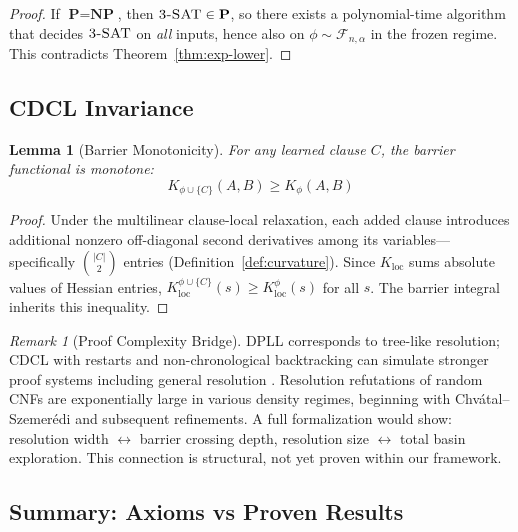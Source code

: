 \documentclass[11pt,a4paper]{article}
\theoremstyle{plain}
\newtheorem{lemma}[theorem]{Lemma}
\theoremstyle{definition}
\theoremstyle{remark}
\newtheorem{remark}[theorem]{Remark}
\newcommand{\threeSAT}{\textsc{3-SAT}}
\newcommand{\NP}{\textbf{NP}}
\newcommand{\PP}{\textbf{P}}
\begin{document}
\begin{proof}
If $\PP=\NP$, then $\threeSAT\in \PP$, so there exists a polynomial-time algorithm that decides $\threeSAT$ on \emph{all} inputs,
hence also on $\phi \sim \mathcal{F}_{n,\alpha}$ in the frozen regime.
This contradicts Theorem~\ref{thm:exp-lower}.
\end{proof}

\subsection{CDCL Invariance}

\begin{lemma}[Barrier Monotonicity]
\label{lem:barrier-mono}
For any learned clause $C$, the barrier functional is monotone:
\begin{equation}
    K_{\phi \cup \{C\}}(A, B) \geq K_{\phi}(A, B)
\end{equation}
\end{lemma}

\begin{proof}
Under the multilinear clause-local relaxation, each added clause introduces additional nonzero off-diagonal second derivatives among its variables---specifically $\binom{|C|}{2}$ entries (Definition~\ref{def:curvature}). Since $K_{\text{loc}}$ sums absolute values of Hessian entries, $K_{\text{loc}}^{\phi \cup \{C\}}(s) \geq K_{\text{loc}}^{\phi}(s)$ for all $s$. The barrier integral inherits this inequality.
\end{proof}

\begin{remark}[Proof Complexity Bridge]
DPLL corresponds to tree-like resolution; CDCL with restarts and non-chronological backtracking can simulate stronger proof systems including general resolution \cite{pipatsrisawat2011}. Resolution refutations of random CNFs are exponentially large in various density regimes, beginning with Chv\'{a}tal--Szemer\'{e}di \cite{chvatal1988} and subsequent refinements. A full formalization would show: resolution width $\leftrightarrow$ barrier crossing depth, resolution size $\leftrightarrow$ total basin exploration. This connection is structural, not yet proven within our framework.
\end{remark}

\subsection{Summary: Axioms vs Proven Results}
\end{document}
